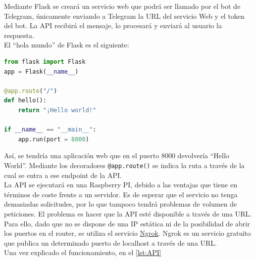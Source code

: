 Mediante Flask se creará un servicio web que podrá ser llamado por el bot de Telegram, únicamente enviando a Telegram la URL del servicio Web y el token del bot. La API recibirá el mensaje, lo procesará y enviará al usuario la respuesta.\\

El ``hola mundo'' de Flask es el siguiente:

\begin{lstlisting}[language=Python, caption= Aplicación Web básica creada con Flask.]
from flask import Flask
app = Flask(__name__)

@app.route("/")
def hello():
    return "¡Hello world!"

if __name__ == "__main__":
    app.run(port = 8000)
\end{lstlisting}

Así, se tendría una aplicación web que en el puerto $8000$ devolvería ``Hello World''. Mediante los decoradores \texttt{@app.route()} se indica la ruta a través de la cual se entra a ese endpoint de la API.\\

La API se ejecutará en una Raspberry PI, debido a las ventajas que tiene en términos de coste frente a un servidor. Es de esperar que el servicio no tenga demasiadas solicitudes, por lo que tampoco tendrá problemas de volumen de peticiones. El problema es hacer que la API esté disponible a través de una URL. Para ello, dado que no se dispone de una IP estática ni de la posibilidad de abrir los puertos en el router, se utiliza el servicio \href{https://ngrok.com/}{Ngrok}. Ngrok es un servicio gratuito que publica un determinado puerto de localhost a través de una URL.\\

Una vez explicado el funcionamiento, en el \autoref{lst:API}

